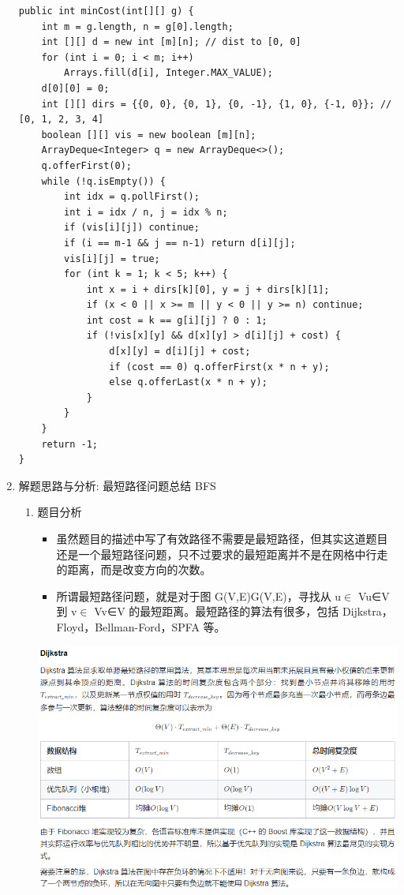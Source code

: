 \documentclass[9pt, b5paaper]{book}
\begin{document}
\begin{enumerate}
\begin{verbatim}
public int minCost(int[][] g) {
    int m = g.length, n = g[0].length;
    int [][] d = new int [m][n]; // dist to [0, 0]
    for (int i = 0; i < m; i++) 
        Arrays.fill(d[i], Integer.MAX_VALUE);
    d[0][0] = 0;
    int [][] dirs = {{0, 0}, {0, 1}, {0, -1}, {1, 0}, {-1, 0}}; // [0, 1, 2, 3, 4]
    boolean [][] vis = new boolean [m][n];
    ArrayDeque<Integer> q = new ArrayDeque<>();
    q.offerFirst(0);
    while (!q.isEmpty()) {
        int idx = q.pollFirst();
        int i = idx / n, j = idx % n;
        if (vis[i][j]) continue;
        if (i == m-1 && j == n-1) return d[i][j];
        vis[i][j] = true;
        for (int k = 1; k < 5; k++) {
            int x = i + dirs[k][0], y = j + dirs[k][1];
            if (x < 0 || x >= m || y < 0 || y >= n) continue;
            int cost = k == g[i][j] ? 0 : 1;
            if (!vis[x][y] && d[x][y] > d[i][j] + cost) {
                d[x][y] = d[i][j] + cost;
                if (cost == 0) q.offerFirst(x * n + y);
                else q.offerLast(x * n + y);
            }
        }
    }
    return -1;
}
\end{verbatim}
\item 解题思路与分析: 最短路径问题总结 BFS
\label{sec-1-6-1-2}
\begin{enumerate}
\item 题目分析
\label{sec-1-6-1-2-1}
\begin{itemize}
\item 虽然题目的描述中写了有效路径不需要是最短路径，但其实这道题目还是一个最短路径问题，只不过要求的最短距离并不是在网格中行走的距离，而是改变方向的次数。
\item 所谓最短路径问题，就是对于图 G(V,E)G(V,E)，寻找从 u$\in$ Vu∈V 到 v$\in$ Vv∈V 的最短距离。最短路径的算法有很多，包括 Dijkstra，Floyd，Bellman-Ford，SPFA 等。
\end{itemize}

\includegraphics[width=.9\linewidth]{./pic/1368.png}


\end{enumerate}
\end{enumerate}
\end{document}
